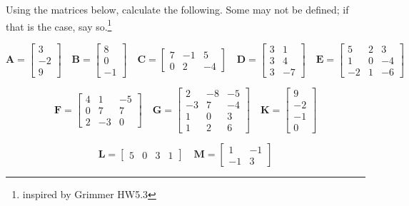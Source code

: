 \documentclass[
]{article}
\begin{document}
Using the matrices below, calculate the following. Some may not be
defined; if that is the case, say so.\footnote{inspired by Grimmer HW5.3}

\[
\mathbf{A} = \left[
  \begin{array}{r}
    3 \\
    -2 \\
    9
  \end{array}
\right]
\quad
\mathbf{B} = \left[
  \begin{array}{r}
    8 \\
    0 \\
    -1
  \end{array}
\right]
\quad
\mathbf{C} = \left[
  \begin{array}{rrr}
    7 & -1 & 5 \\
    0 & 2 & -4
  \end{array}
\right]
\quad
\mathbf{D} = \left[
  \begin{array}{rr}
    3 & 1 \\
    3 & 4 \\
    3 & -7
  \end{array}
\right]
\quad
\mathbf{E} = \left[
  \begin{array}{rrr}
    5 & 2 & 3 \\
    1 & 0 & -4 \\
    -2 & 1 & -6
  \end{array}
\right]
\]

\[
\mathbf{F} = \left[
  \begin{array}{rrr}
    4 & 1 & -5 \\
    0 & 7 & 7 \\
    2 & -3 & 0
  \end{array}
\right]
\quad
\mathbf{G} = \left[
  \begin{array}{rrr}
    2 & -8 & -5 \\
    -3 & 7 & -4 \\
    1 & 0 & 3 \\
    1 & 2 & 6
  \end{array}
\right]
\quad
\mathbf{K} = \left[
  \begin{array}{r}
    9 \\
    -2 \\
    -1 \\
    0
  \end{array}
\right]
\]

\[
\mathbf{L} = \left[
  \begin{array}{rrrr}
    5 & 0 & 3 & 1
  \end{array}
\right]
\quad
\mathbf{M} = \begin{bmatrix}
1 & -1 \\
-1 & 3
\end{bmatrix}
\]
\end{document}
